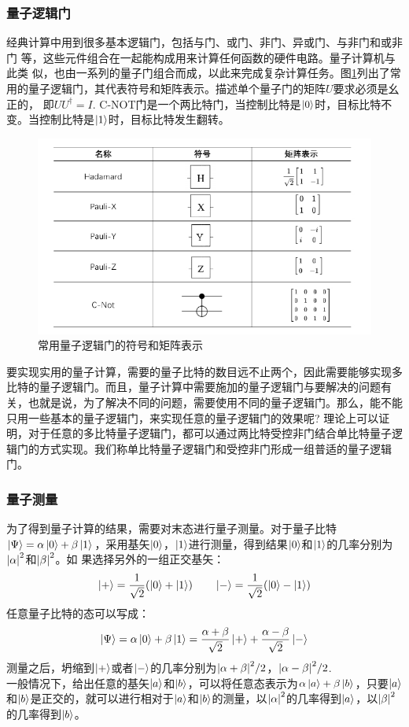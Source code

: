 \documentclass[a4paper]{article}
\begin{document}
\subsubsection{量子逻辑门}
经典计算中用到很多基本逻辑门，包括与门、或门、非门、异或门、与非门和或非门
等，这些元件组合在一起能构成用来计算任何函数的硬件电路。量子计算机与此类
似，也由一系列的量子门组合而成，以此来完成复杂计算任务。图\ref{fig:gate}列出了常用的量子逻辑门，其代表符号和矩阵表示。描述单个量子门的矩阵$ U $要求必须是幺正的，
即$ U U^\dagger = I $. C-NOT门是一个两比特门，当控制比特是$ \ket{0} $时，目标比特不变。当控制比特是$ \ket{1} $时，目标比特发生翻转。\\
\begin{figure}[H]
	\centering
	\includegraphics[width=0.8\linewidth]{fig/2.jpg}
	\caption{常用量子逻辑门的符号和矩阵表示}
	\label{fig:gate}
\end{figure}
要实现实用的量子计算，需要的量子比特的数目远不止两个，因此需要能够实现多比特的量子逻辑门。而且，量子计算中需要施加的量子逻辑门与要解决的问题有关，也就是说，为了解决不同的问题，需要使用不同的量子逻辑门。那么，能不能只用一些基本的量子逻辑门，来实现任意的量子逻辑门的效果呢? 理论上可以证明，对于任意的多比特量子逻辑门，都可以通过两比特受控非门结合单比特量子逻辑门的方式实现。我们称单比特量子逻辑门和受控非门形成一组普适的量子逻辑门。

\subsubsection{量子测量}
为了得到量子计算的结果，需要对末态进行量子测量。对于量子比特$ \ket{\Psi} = \alpha\ket{0} + \beta\ket{1} $，采用基矢$ \ket{0} $，$ \ket{1} $进行测量，得到结果$ \ket{0} $和$ \ket{1} $的几率分别为$ \abs{\alpha}^2 $和$ \abs{\beta}^2 $。如
果选择另外的一组正交基矢：
\begin{equation}\label{key}
\ket{+} = \dfrac{1}{\sqrt{2}}(\ket{0} + \ket{1})  \qquad \ket{-} = \dfrac{1}{\sqrt{2}}(\ket{0} - \ket{1})
\end{equation}
任意量子比特的态可以写成：
\begin{equation}\label{key}
\ket{\Psi} = \alpha\ket{0} + \beta\ket{1} = \dfrac{\alpha+\beta}{\sqrt{2}}\ket{+} + \dfrac{\alpha-\beta}{\sqrt{2}}\ket{-}
\end{equation}
测量之后，坍缩到$ \ket{+} $或者$ \ket{-} $的几率分别为$ \abs{\alpha+\beta}^2/2 $，$ \abs{\alpha-\beta}^2/2 $.\\
一般情况下，给出任意的基矢$ \ket{a} $和$ \ket{b} $，可以将任意态表示为$ \alpha\ket{a}+ \beta\ket{b} $，只要$ \ket{a} $和$ \ket{b} $是正交的，就可以进行相对于$ \ket{a} $和$ \ket{b} $的测量，以$ \abs{\alpha}^2 $的几率得到$ \ket{a} $，以$ \abs{\beta}^2 $的几率得到$ \ket{b} $。
\end{document}
